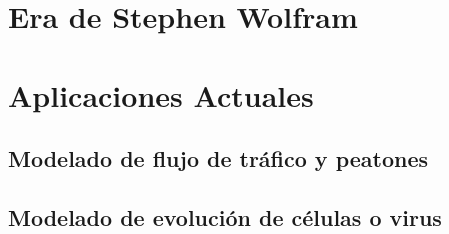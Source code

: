 
\section{Era de Stephen Wolfram} %


\section{Aplicaciones Actuales} %

\subsection{Modelado de flujo de tráfico y peatones}

\subsection{Modelado de evolución de células o virus}







